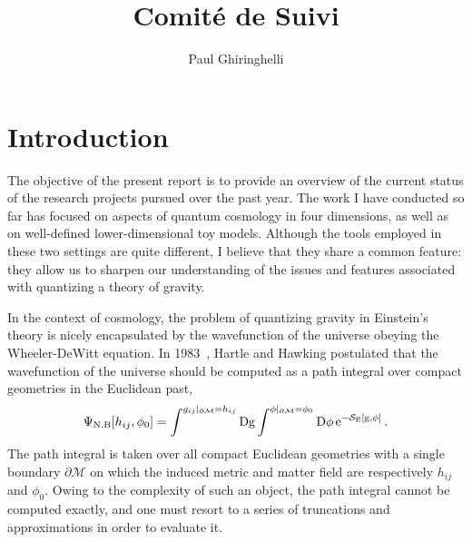 \documentclass[a4paper]{article}
\title{Comité de Suivi}
\author[a]{Paul Ghiringhelli}
\affiliation[a]{\href{https://www.cpht.polytechnique.fr/?q=en}{CPHT, CNRS, École polytechnique, Institut Polytechnique de Paris},  91120 Palaiseau, France}
\begin{document}
\maketitle
\flushbottom



\section{Introduction}

The objective of the present report is to provide an overview of the current status of the research projects pursued over the past year. The work I have conducted so far has focused on aspects of quantum cosmology in four dimensions, as well as on well-defined lower-dimensional toy models. Although the tools employed in these two settings are quite different, I believe that they share a common feature: they allow us to sharpen our understanding of the issues and features associated with quantizing a theory of gravity.

In the context of cosmology, the problem of quantizing gravity in Einstein's theory is nicely encapsulated by the wavefunction of the universe obeying the Wheeler-DeWitt equation. In 1983~\cite{PhysRevD.28.2960}, Hartle and Hawking postulated that the wavefunction of the universe should be computed as a path integral over compact geometries in the Euclidean past,
\begin{equation}
\Psi_{\rm N.B} [h_{ij}, \phi_0] = \int ^{g_{ij}|_{\partial \mathcal{M}} = h_{ij}} \rm{D}g \int ^{\phi|_{\partial \mathcal{M}}= \phi_0} \rm{D}\phi \, e^{-\mathcal{S}_{E}[g,\phi]} \,.
\end{equation}
The path integral is taken over all compact Euclidean geometries with a single boundary $\partial \mathcal{M}$ on which the induced metric and matter field are respectively $h_{ij}$ and $\phi_0$. Owing to the complexity of such an object, the path integral cannot be computed exactly, and one must resort to a series of truncations and approximations in order to evaluate it.
\end{document}
